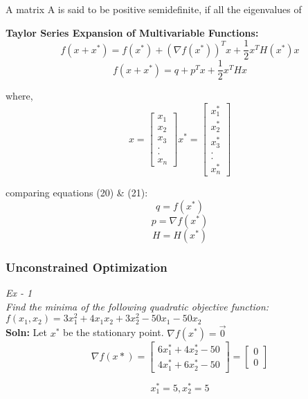 \documentclass[12pt, letterpaper]{article}
\begin{document}
A matrix A is said to be positive semidefinite, if all the eigenvalues of 

\textbf{Taylor Series Expansion of Multivariable Functions: }
\begin{equation}f(x+x^*) = f(x^*) + (\nabla f(x^*))^T x + \frac{1}{2}x^T H(x^*) x\end{equation}
\begin{equation} f(x+x^*) = q + p^T x + \frac{1}{2}x^T H x\end{equation}

where,
$$x = \begin{bmatrix}x_1 \\ x_2 \\ x_3 \\.\\.\\ x_n \end{bmatrix}
  x^* = \begin{bmatrix}x_1^* \\ x_2^* \\ x_3^* \\.\\.\\ x_n^* \end{bmatrix}$$
  
 comparing equations (20) \& (21): \\
 $$q = f(x^*)$$
 $$p = \nabla f(x^*)$$
 $$H = H(x^*)$$
\subsubsection{Unconstrained Optimization}
\emph{Ex - 1 \\
Find the minima of the following quadratic objective function: \\
    $f(x_1,x_2) = 3x_1^2 + 4x_1x_2 + 3x_2^2 - 50x_1 - 50x_2$ } \\
    
\textbf{Soln: }
Let $x^*$ be the stationary point.
\therefore  $\nabla f(x^*) = \overrightarrow 0$
\begin{equation}
    \nabla f(x*) = \begin{bmatrix}6x_1^* + 4x_2^* - 50 \\ 4x_1^* + 6x_2^* - 50\end{bmatrix} = \begin{bmatrix}
    0 \\ 0
    \end{bmatrix}
\end{equation}

\begin{equation}
  x_1^* = 5 , x_2^* = 5
\end{equation}
\end{document}
